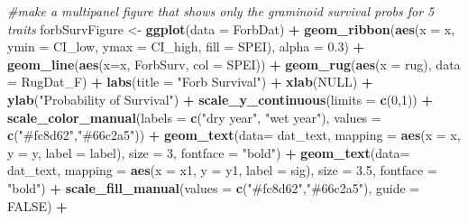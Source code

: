 \documentclass[
]{article}
\newenvironment{Shaded}{\begin{snugshade}}{\end{snugshade}}
\newcommand{\CommentTok}[1]{\textcolor[rgb]{0.56,0.35,0.01}{\textit{#1}}}
\newcommand{\DataTypeTok}[1]{\textcolor[rgb]{0.13,0.29,0.53}{#1}}
\newcommand{\DecValTok}[1]{\textcolor[rgb]{0.00,0.00,0.81}{#1}}
\newcommand{\FloatTok}[1]{\textcolor[rgb]{0.00,0.00,0.81}{#1}}
\newcommand{\KeywordTok}[1]{\textcolor[rgb]{0.13,0.29,0.53}{\textbf{#1}}}
\newcommand{\NormalTok}[1]{#1}
\newcommand{\OperatorTok}[1]{\textcolor[rgb]{0.81,0.36,0.00}{\textbf{#1}}}
\newcommand{\OtherTok}[1]{\textcolor[rgb]{0.56,0.35,0.01}{#1}}
\newcommand{\StringTok}[1]{\textcolor[rgb]{0.31,0.60,0.02}{#1}}
\begin{document}
\begin{Shaded}
\begin{Highlighting}[]
\CommentTok{\#make a multipanel figure that shows only the graminoid survival probs for 5 traits}
\NormalTok{forbSurvFigure \textless{}{-}}\StringTok{ }\KeywordTok{ggplot}\NormalTok{(}\DataTypeTok{data =}\NormalTok{ ForbDat) }\OperatorTok{+}
\StringTok{  }\KeywordTok{geom\_ribbon}\NormalTok{(}\KeywordTok{aes}\NormalTok{(}\DataTypeTok{x =}\NormalTok{ x, }\DataTypeTok{ymin =}\NormalTok{ CI\_low, }\DataTypeTok{ymax =}\NormalTok{ CI\_high, }\DataTypeTok{fill =}\NormalTok{ SPEI), }\DataTypeTok{alpha =} \FloatTok{0.3}\NormalTok{) }\OperatorTok{+}
\StringTok{  }\KeywordTok{geom\_line}\NormalTok{(}\KeywordTok{aes}\NormalTok{(}\DataTypeTok{x=}\NormalTok{x, ForbSurv, }\DataTypeTok{col =}\NormalTok{ SPEI))  }\OperatorTok{+}\StringTok{ }
\StringTok{  }\KeywordTok{geom\_rug}\NormalTok{(}\KeywordTok{aes}\NormalTok{(}\DataTypeTok{x =}\NormalTok{ rug), }\DataTypeTok{data =}\NormalTok{ RugDat\_F) }\OperatorTok{+}
\StringTok{  }\KeywordTok{labs}\NormalTok{(}\DataTypeTok{title =} \StringTok{"Forb Survival"}\NormalTok{) }\OperatorTok{+}
\StringTok{  }\KeywordTok{xlab}\NormalTok{(}\OtherTok{NULL}\NormalTok{) }\OperatorTok{+}
\StringTok{  }\KeywordTok{ylab}\NormalTok{(}\StringTok{"Probability of Survival"}\NormalTok{) }\OperatorTok{+}
\StringTok{  }\KeywordTok{scale\_y\_continuous}\NormalTok{(}\DataTypeTok{limits =} \KeywordTok{c}\NormalTok{(}\DecValTok{0}\NormalTok{,}\DecValTok{1}\NormalTok{)) }\OperatorTok{+}
\StringTok{  }\KeywordTok{scale\_color\_manual}\NormalTok{(}\DataTypeTok{labels =} \KeywordTok{c}\NormalTok{(}\StringTok{"dry year"}\NormalTok{, }\StringTok{"wet year"}\NormalTok{), }\DataTypeTok{values =} \KeywordTok{c}\NormalTok{(}\StringTok{"\#fc8d62"}\NormalTok{,}\StringTok{"\#66c2a5"}\NormalTok{)) }\OperatorTok{+}
\StringTok{  }\KeywordTok{geom\_text}\NormalTok{(}\DataTypeTok{data=}\NormalTok{ dat\_text, }\DataTypeTok{mapping =} \KeywordTok{aes}\NormalTok{(}\DataTypeTok{x =}\NormalTok{ x, }\DataTypeTok{y =}\NormalTok{ y, }\DataTypeTok{label =}\NormalTok{ label), }\DataTypeTok{size =} \DecValTok{3}\NormalTok{, }\DataTypeTok{fontface =} \StringTok{"bold"}\NormalTok{) }\OperatorTok{+}
\StringTok{  }\KeywordTok{geom\_text}\NormalTok{(}\DataTypeTok{data=}\NormalTok{ dat\_text, }\DataTypeTok{mapping =} \KeywordTok{aes}\NormalTok{(}\DataTypeTok{x =}\NormalTok{ x1, }\DataTypeTok{y =}\NormalTok{ y1, }\DataTypeTok{label =}\NormalTok{ sig), }\DataTypeTok{size =} \FloatTok{3.5}\NormalTok{, }\DataTypeTok{fontface =} \StringTok{"bold"}\NormalTok{) }\OperatorTok{+}
\StringTok{  }\KeywordTok{scale\_fill\_manual}\NormalTok{(}\DataTypeTok{values =} \KeywordTok{c}\NormalTok{(}\StringTok{"\#fc8d62"}\NormalTok{,}\StringTok{"\#66c2a5"}\NormalTok{), }\DataTypeTok{guide =} \OtherTok{FALSE}\NormalTok{) }\OperatorTok{+}

\end{Highlighting}
\end{Shaded}
\end{document}
